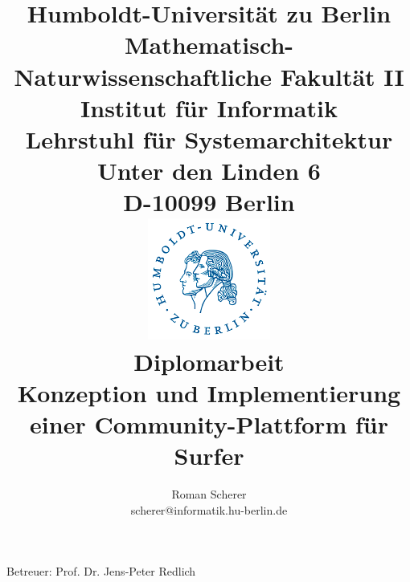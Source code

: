 \documentclass[12pt,a4paper,ngerman]{article}
\author{Roman Scherer \\ scherer@informatik.hu-berlin.de}
\title{{\small
    Humboldt-Universität zu Berlin \\
    Mathematisch-Naturwissenschaftliche Fakultät II \\
    Institut für Informatik \\
    Lehrstuhl für Systemarchitektur \\
    Unter den Linden 6 \\
    D-10099 Berlin \\
  } \vspace{0.4cm}
  \includegraphics[width=4cm]{bilder/husiegel_bw} \\
  \vspace{0.4cm}
  \large{Diplomarbeit} \\
  \LARGE{\textbf{Konzeption und Implementierung einer Community-Plattform für Surfer}} \\
}
\begin{document}
\maketitle

\begin{center}
  Betreuer: Prof. Dr. Jens-Peter Redlich
\end{center}






\end{document}
